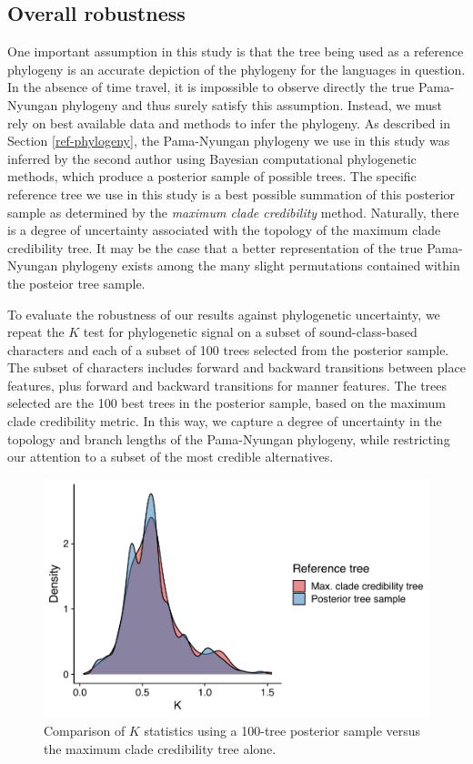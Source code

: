 \hypertarget{overall-robustness}{%
\subsection{Overall robustness}\label{overall-robustness}}

One important assumption in this study is that the tree being used as a reference phylogeny is an accurate depiction of the phylogeny for the languages in question. In the absence of time travel, it is impossible to observe directly the true Pama-Nyungan phylogeny and thus surely satisfy this assumption. Instead, we must rely on best available data and methods to infer the phylogeny. As described in Section \ref{ref-phylogeny}, the Pama-Nyungan phylogeny we use in this study was inferred by the second author using Bayesian computational phylogenetic methods, which produce a posterior sample of possible trees. The specific reference tree we use in this study is a best possible summation of this posterior sample as determined by the \emph{maximum clade credibility} method. Naturally, there is a degree of uncertainty associated with the topology of the maximum clade credibility tree. It may be the case that a better representation of the true Pama-Nyungan phylogeny exists among the many slight permutations contained within the posteior tree sample.

To evaluate the robustness of our results against phylogenetic uncertainty, we repeat the \(K\) test for phylogenetic signal on a subset of sound-class-based characters and each of a subset of 100 trees selected from the posterior sample. The subset of characters includes forward and backward transitions between place features, plus forward and backward transitions for manner features. The trees selected are the 100 best trees in the posterior sample, based on the maximum clade credibility metric. In this way, we capture a degree of uncertainty in the topology and branch lengths of the Pama-Nyungan phylogeny, while restricting our attention to a subset of the most credible alternatives.

\begin{figure}

{\centering \includegraphics[width=0.66\linewidth]{fig/k-mcct-posterior} 

}

\caption{Comparison of $K$ statistics using a 100-tree posterior sample versus the maximum clade credibility tree alone.}\label{fig:tree-uncertainty}
\end{figure}

